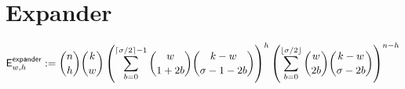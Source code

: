
\section{Expander}




$$
\mathsf{E}^{\textsf{expander}}_{w,h}:=\binom{n}{h}\binom{k}{w} 
\left(\sum_{b=0}^{\lceil\sigma/2\rceil-1}\binom{w}{1+2b}\binom{k-w}{\sigma-1-2b} \right)^h
\left(\sum_{b=0}^{\lfloor\sigma/2\rfloor}\binom{w}{2b}\binom{k-w}{\sigma-2b} \right)^{n-h}
$$